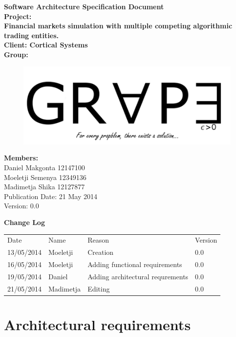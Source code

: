 \documentclass[12pt]{article}
\newcommand{\Title}{Software Architecture Specification Document} %
\begin{document}
	\begin{center}%
		\LARGE \bf \Title \\[2em]
		\Large {Project:}\\
		Financial markets simulation with multiple competing algorithmic trading entities.\\[0.7em]
		\Large {Client:}
		Cortical Systems\\[2em]
		\LARGE {\bf Group:}\\
			\begin{figure}[ht!]
				\centering
				\includegraphics[scale=0.4]{Logo8.png}
			\end{figure}
			
		\Large {\bf Members:}\\[0.3em]
		\large
		Daniel Makgonta 12147100\\
		Moeletji Semenya 12349136\\
		Madimetja Shika 12127877\\[3em]
	
	\small Publication Date: 21 May 2014\\[0.5em]
	\small Version: 0.0 		    
	\end{center}%
	
	\newpage		
	\large 
 	{\bf Change Log}\\[1em]
	\begin{tabular}{llll}
		Date & Name & Reason & Version \\
		13/05/2014 & Moeletji & Creation & 0.0 \\
		16/05/2014 & Moeletji & Adding functional requirements & 0.0 \\
		19/05/2014 & Daniel & Adding architectural requrements & 0.0 \\
		21/05/2014 & Madimetja & Editing & 0.0
	\end{tabular}
	

	
	\newpage
	\tableofcontents
				  
	\newpage
	\section{Architectural requirements}	    
\end{document}

